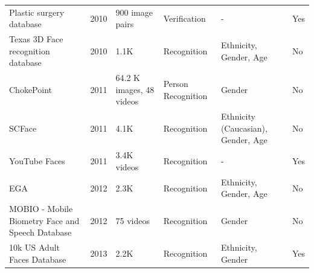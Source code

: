 \documentclass[journal]{IEEEtran}
\begin{document}
\begin{table}[!t]
\begin{tabular}{|p{}|C{0.025\textwidth}|C{0.09\textwidth}|p{0.19\textwidth}|p{0.2\textwidth}|C{0.06\textwidth}|}
Plastic surgery database \cite{singh2010plastic}                                        & 2010          & 900 image pairs             & Verification                                                                   & -                                                   & Yes                    \\
Texas 3D Face recognition database \cite{gupta2010texas}                                & 2010          & 1.1K                        & Recognition                                                                    & Ethnicity, Gender, Age                              & No                     \\
ChokePoint \cite{wong2011patch}                                                         & 2011          & 64.2 K images, 48 videos    & Person Recognition                                                             & Gender                                              & No                     \\
SCFace \cite{grgic2011scface}                                                           & 2011          & 4.1K                        & Recognition                                                                    & Ethnicity (Caucasian), Gender, Age                  & No                     \\
YouTube Faces \cite{wolf2011face}                                                       & 2011          & 3.4K videos                 & Recognition                                                                    & -                                                   & Yes                    \\
EGA \cite{riccio2012ega}                                                                & 2012          & 2.3K                        & Recognition                                                                    & Ethnicity, Gender, Age                              & No                     \\
MOBIO - Mobile Biometry Face and Speech Database \cite{tresadern2012mobile}             & 2012          & 75 videos                   & Recognition                                                                    & Gender                                              & No                     \\
10k US Adult Faces Database \cite{bainbridge2013intrinsic}                              & 2013          & 2.2K                        & Recognition                                                                    & Ethnicity, Gender                                   & Yes                    \\

\end{tabular}
\end{table}
\end{document}
